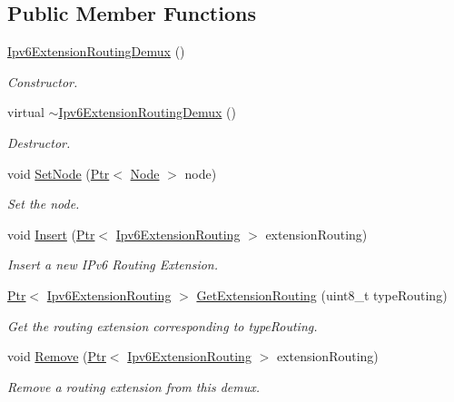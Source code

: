 \subsection*{Public Member Functions}
\begin{DoxyCompactItemize}
\item 
\hyperlink{classns3_1_1Ipv6ExtensionRoutingDemux_a14a079eeaa949b70cd2d9103dbbeb0bf}{Ipv6\+Extension\+Routing\+Demux} ()
\begin{DoxyCompactList}\small\item\em Constructor. \end{DoxyCompactList}\item 
virtual \hyperlink{classns3_1_1Ipv6ExtensionRoutingDemux_a80de4ee49c09dc7378b3cbeb25707a4c}{$\sim$\+Ipv6\+Extension\+Routing\+Demux} ()
\begin{DoxyCompactList}\small\item\em Destructor. \end{DoxyCompactList}\item 
void \hyperlink{classns3_1_1Ipv6ExtensionRoutingDemux_aaaf116b4ace092c4908f7d6c44e149ab}{Set\+Node} (\hyperlink{classns3_1_1Ptr}{Ptr}$<$ \hyperlink{classns3_1_1Node}{Node} $>$ node)
\begin{DoxyCompactList}\small\item\em Set the node. \end{DoxyCompactList}\item 
void \hyperlink{classns3_1_1Ipv6ExtensionRoutingDemux_a87aeb9121d98b6fd92d2ba16b2cad5ba}{Insert} (\hyperlink{classns3_1_1Ptr}{Ptr}$<$ \hyperlink{classns3_1_1Ipv6ExtensionRouting}{Ipv6\+Extension\+Routing} $>$ extension\+Routing)
\begin{DoxyCompactList}\small\item\em Insert a new I\+Pv6 Routing Extension. \end{DoxyCompactList}\item 
\hyperlink{classns3_1_1Ptr}{Ptr}$<$ \hyperlink{classns3_1_1Ipv6ExtensionRouting}{Ipv6\+Extension\+Routing} $>$ \hyperlink{classns3_1_1Ipv6ExtensionRoutingDemux_abe588e0902177a2cf9b0fd192adad272}{Get\+Extension\+Routing} (uint8\+\_\+t type\+Routing)
\begin{DoxyCompactList}\small\item\em Get the routing extension corresponding to type\+Routing. \end{DoxyCompactList}\item 
void \hyperlink{classns3_1_1Ipv6ExtensionRoutingDemux_abe80b0aecaf707d68b6985fb5385b262}{Remove} (\hyperlink{classns3_1_1Ptr}{Ptr}$<$ \hyperlink{classns3_1_1Ipv6ExtensionRouting}{Ipv6\+Extension\+Routing} $>$ extension\+Routing)
\begin{DoxyCompactList}\small\item\em Remove a routing extension from this demux. \end{DoxyCompactList}\end{DoxyCompactItemize}

